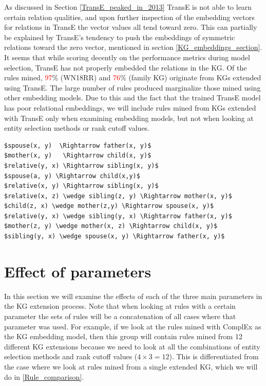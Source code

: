 As discussed in Section \ref{TransE_peaked_in_2013} TransE is not able to learn certain relation qualities, and upon further inspection of the embedding vectors for relations in TransE the vector values all tend toward zero. This can partially be explained by TransE's tendency to push the embeddings of symmetric relations toward the zero vector, mentioned in section \ref{KG_embeddings_section}. It seems that while scoring decently on the performance metrics during model selection, TransE has not properly embedded the relations in the KG. Of the rules mined, \textcolor{red}{97}\% (WN18RR) and \textcolor{red}{76}\% (family KG) originate from KGs extended using TransE. The large number of rules produced marginalize those mined using other embedding models. Due to this and the fact that the trained TransE model has poor relational embeddings, we will include rules mined from KGs extended with TransE only when examining embedding models, but not when looking at entity selection methods or rank cutoff values.

\begin{lstlisting}[mathescape=true, float, caption={Selection of nonsense rules mined from KGs extended with TransE.},captionpos=b, label={TransE_nonsense_rules}]
$spouse(x, y)  \Rightarrow father(x, y)$
$mother(x, y)   \Rightarrow child(x, y)$
$relative(y, x) \Rightarrow sibling(x, y)$
$spouse(a, y) \Rightarrow child(x,y)$
$relative(x, y) \Rightarrow sibling(x, y)$
$relative(x, z) \wedge sibling(z, y) \Rightarrow mother(x, y)$
$child(z, x) \wedge mother(z,y) \Rightarrow spouse(x, y)$
$relative(y, x) \wedge sibling(y, x) \Rightarrow father(x, y)$
$mother(z, y) \wedge mother(x, z) \Rightarrow child(x, y)$
$sibling(y, x) \wedge spouse(x, y) \Rightarrow father(x, y)$
\end{lstlisting}

\section{Effect of parameters}
In this section we will examine the effects of each of the three main parameters in the KG extension process. Note that when looking at rules with a certain parameter the sets of rules will be a concatenation of all cases where that parameter was used. For example, if we look at the rules mined with ComplEx as the KG embedding model, then this group will contain rules mined from 12 different KG extensions because we need to look at all the combinations of entity selection methods and rank cutoff values ($4\times3=12$). This is differentiated from the case where we look at rules mined from a single extended KG, which we will do in \cref{Rule_comparison}.

